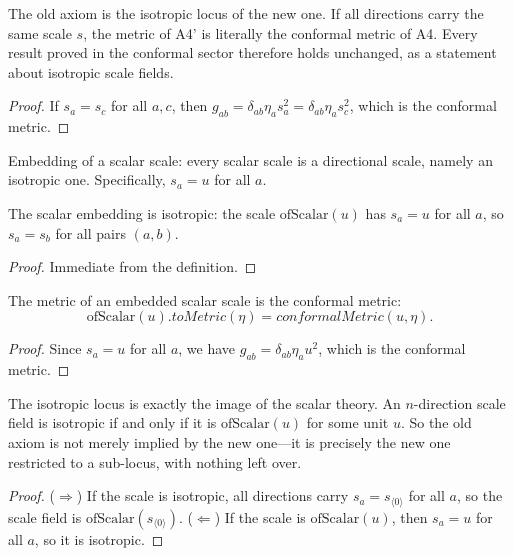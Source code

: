 \begin{theorem}
The old axiom is the isotropic locus of the new one. If all directions carry the same scale $s$, the metric of A4' is literally the conformal metric of A4. Every result proved in the conformal sector therefore holds unchanged, as a statement about isotropic scale fields. 
\end{theorem}

\begin{proof}
If $s_a = s_c$ for all $a,c$, then $g_{ab} = \delta_{ab}\eta_a s_a^2 = \delta_{ab}\eta_a s_c^2$, which is the conformal metric.
\end{proof}

\begin{definition}
Embedding of a scalar scale: every scalar scale is a directional scale, namely an isotropic one. Specifically, $s_a = u$ for all $a$. 
\end{definition}

\begin{theorem}
The scalar embedding is isotropic: the scale $\text{ofScalar}(u)$ has $s_a = u$ for all $a$, so $s_a = s_b$ for all pairs $(a,b)$. 
\end{theorem}

\begin{proof}
Immediate from the definition.
\end{proof}

\begin{theorem}
The metric of an embedded scalar scale is the conformal metric:
$$\text{ofScalar}(u).toMetric(\eta) = conformalMetric(u, \eta).$$
\end{theorem}

\begin{proof}
Since $s_a = u$ for all $a$, we have $g_{ab} = \delta_{ab}\eta_a u^2$, which is the conformal metric.
\end{proof}

\begin{theorem}
The isotropic locus is exactly the image of the scalar theory. An $n$-direction scale field is isotropic if and only if it is $\text{ofScalar}(u)$ for some unit $u$. So the old axiom is not merely implied by the new one---it is precisely the new one restricted to a sub-locus, with nothing left over. 
\end{theorem}

\begin{proof}
($\Rightarrow$) If the scale is isotropic, all directions carry $s_a = s_{\langle 0 \rangle}$ for all $a$, so the scale field is $\text{ofScalar}(s_{\langle 0 \rangle})$. ($\Leftarrow$) If the scale is $\text{ofScalar}(u)$, then $s_a = u$ for all $a$, so it is isotropic.
\end{proof}

